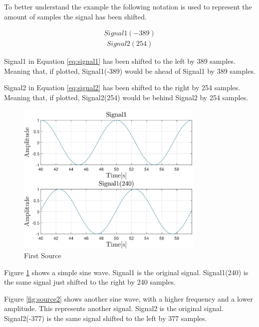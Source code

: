 To better understand the example the following notation is used to represent the 
amount of samples the signal has been shifted. 

\begin{align}
	Signal1(-389)
	\label{eq:signal1}
\end{align}
\begin{align}
	Signal2(254)
	\label{eq:signal2}
\end{align}

Signal1 in Equation \ref{eq:signal1} has been shifted to the left by 389 samples. 
Meaning that, if plotted, Signal1(-389) would be ahead of Signal1 by 389 samples.

Signal2 in Equation \ref{eq:signal2} has been shifted to the right by 254 samples. 
Meaning that, if plotted, Signal2(254) would be behind Signal2 by 254 samples.

\begin{figure}[htp]
	\centering
	\includegraphics[width=0.8\textwidth]{Illustrations/source1.jpg}
	\caption{First Source}
	\label{fig:source1}
\end{figure}

Figure \ref{fig:source1} shows a simple sine wave. Signal1 is the original signal. 
Signal1(240) is the same signal just shifted to the right by 240 samples.
\newpage

Figure \ref{fig:source2} shows another sine wave, with a higher frequency and a 
lower amplitude. This represents another signal. Signal2 is the original signal. 
Signal2(-377) is the same signal shifted to the left by 377 samples.

